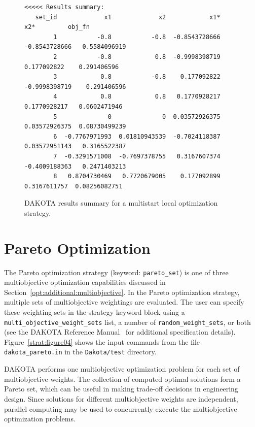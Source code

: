 \begin{figure}
\centering
\begin{bigbox}
\begin{footnotesize}
\begin{verbatim}
<<<<< Results summary:
   set_id             x1             x2            x1*            x2*         obj_fn 
        1           -0.8           -0.8  -0.8543728666  -0.8543728666   0.5584096919 
        2           -0.8            0.8  -0.9998398719    0.177092822    0.291406596 
        3            0.8           -0.8    0.177092822  -0.9998398719    0.291406596 
        4            0.8            0.8   0.1770928217   0.1770928217   0.0602471946 
        5              0              0  0.03572926375  0.03572926375  0.08730499239 
        6  -0.7767971993  0.01810943539  -0.7024118387  0.03572951143   0.3165522387 
        7  -0.3291571008  -0.7697378755   0.3167607374  -0.4009188363   0.2471403213 
        8   0.8704730469   0.7720679005    0.177092899   0.3167611757  0.08256082751 
\end{verbatim}
\end{footnotesize}
\end{bigbox}
\caption{DAKOTA results summary for a multistart local optimization strategy.}
\label{strat:figure03}
\end{figure}

\section{Pareto Optimization}\label{strat:pareto}

The Pareto optimization strategy (keyword: \texttt{pareto\_set}) is
one of three multiobjective optimization capabilities discussed in
Section~\ref{opt:additional:multiobjective}. In the Pareto
optimization strategy, multiple sets of multiobjective weightings are
evaluated. The user can specify these weighting sets in the strategy
keyword block using a \texttt{multi\_objective\_weight\_sets} list, a
number of \texttt{random\_weight\_sets}, or both (see the DAKOTA
Reference Manual~\cite{RefMan} for additional specification details).
Figure~\ref{strat:figure04} shows the input commands from the file
\texttt{dakota\_pareto.in} in the \texttt{Dakota/test} directory.

DAKOTA performs one multiobjective optimization problem for each set
of multiobjective weights. The collection of computed optimal
solutions form a Pareto set, which can be useful in making trade-off
decisions in engineering design. Since solutions for different
multiobjective weights are independent, parallel computing may be used
to concurrently execute the multiobjective optimization problems.

